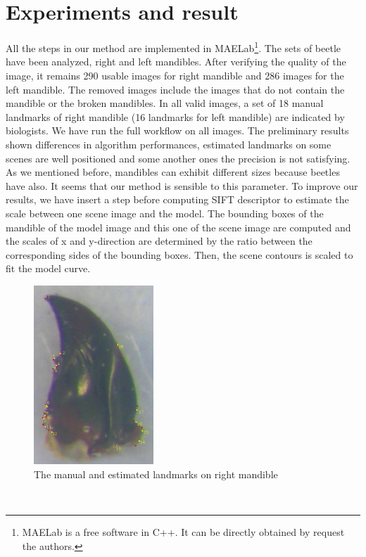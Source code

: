 \documentclass[twoside,twocolumn,10pt]{article}
\begin{document}
\section{Experiments and result}
All the steps in our method are implemented in MAELab\footnote{MAELab
  is a free software in C++. It can be directly obtained by request
  the authors.}. The sets of beetle have been analyzed, right and left
mandibles. After verifying the quality of the image, it remains 290
usable images for right mandible and 286 images for the left mandible. The
removed images include the images that do not contain the mandible or
the broken mandibles. In all valid images, a set of 18 manual landmarks of right mandible (16 landmarks for left mandible) are indicated by biologists. We have run the full workflow on all images. The preliminary results shown differences in algorithm performances, estimated landmarks on some scenes are well positioned and some another ones the precision is not satisfying. As we mentioned before, mandibles can exhibit different sizes because beetles have also. It seems that our method is sensible to this parameter. To improve our results, we have insert a step before computing SIFT descriptor to estimate the scale between one scene image and the model. The bounding boxes of the mandible of the model image and this one of the scene image are computed and the scales of x and y-direction are determined by the ratio between the corresponding sides of the bounding boxes. Then, the scene contours is scaled to fit the model curve. 
\begin{figure}[h]
\centering
\includegraphics[width=0.4\textwidth]{./images/md_rs}
\caption{The manual and estimated landmarks on right mandible}
\label{figresult}
\end{figure}~\\
\end{document}
